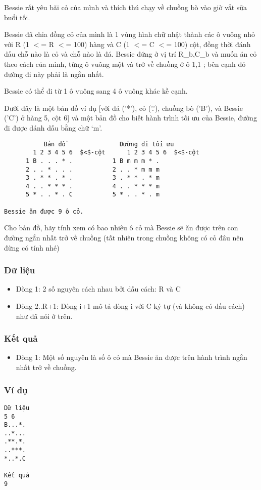



   Bessie rất yêu bãi cỏ của mình và thích thú chạy về chuồng bò vào  giờ vắt sữa buổi tối.  

   Bessie đã chia đồng cỏ của mình là 1 vùng hình chữ nhật thành  các ô vuông nhỏ với R (1 $<$= R $<$= 100) hàng và C (1 $<$= C $<$= 100) cột,  đồng thời đánh dấu chỗ nào là cỏ và chỗ nào là đá. Bessie đứng ở vị  trí R\_b,C\_b và muốn ăn cỏ theo cách của mình, từng ô vuông một và  trở về chuồng ở ô 1,1 ; bên cạnh đó đường đi này phải là ngắn nhất.  

   Bessie có thể đi từ 1 ô vuông sang 4 ô vuông khác kề cạnh.  

   Dưới đây là một bản đồ ví dụ [với đá ('*'), cỏ ('.'),  chuồng bò ('B'),  và Bessie ('C') ở hàng 5, cột 6] và một bản đồ cho biết hành trình  tối ưu của Bessie, đường đi được dánh dấu bằng chữ ‘m’.  
\begin{verbatim}
           Bản đồ               Đường đi tối ưu
        1 2 3 4 5 6  $<$-cột      1 2 3 4 5 6  $<$-cột
      1 B . . . * .           1 B m m m * .
      2 . . * . . .           2 . . * m m m
      3 . * * . * .           3 . * * . * m
      4 . . * * * .           4 . . * * * m
      5 * . . * . C           5 * . . * . m

Bessie ăn được 9 ô cỏ.
\end{verbatim}

   Cho bản đồ, hãy tính xem có bao nhiêu ô cỏ mà Bessie sẽ ăn được trên  con đường ngắn nhất trở về chuồng (tất nhiên trong chuồng không có  cỏ đâu nên đừng có tính nhé)  

\subsubsection{   Dữ liệu  }
\begin{itemize}
	\item     Dòng 1: 2 số nguyên cách nhau bởi dấu cách: R và C   
	\item     Dòng 2..R+1: Dòng i+1 mô tả dòng i với C ký tự (và không có dấu          cách) như đã nói ở trên.   
\end{itemize}

\subsubsection{   Kết quả  }
\begin{itemize}
	\item     Dòng 1: Một số nguyên là số ô cỏ mà Bessie ăn được trên hành        trình ngắn nhất trở về chuồng.   
\end{itemize}

\subsubsection{   Ví dụ  }
\begin{verbatim}
Dữ liệu
5 6
B...*.
..*...
.**.*.
..***.
*..*.C

Kết quả
9
\end{verbatim}
